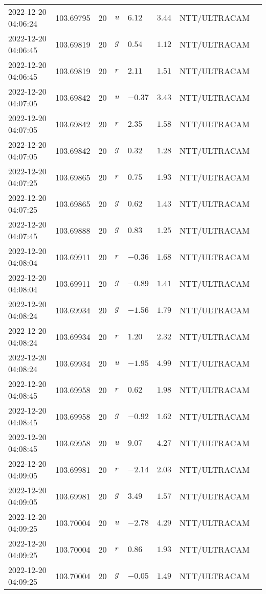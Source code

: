 \documentclass{nature_plusfigure}
\begin{document}
\begin{supplement}
\begin{center}
\begin{longtable}{llllllll}
2022-12-20 04:06:24 & 103.69795 & 20 & $u$ & $6.12$ & $3.44$ & NTT/ULTRACAM &  \\ 
2022-12-20 04:06:45 & 103.69819 & 20 & $g$ & $0.54$ & $1.12$ & NTT/ULTRACAM &  \\ 
2022-12-20 04:06:45 & 103.69819 & 20 & $r$ & $2.11$ & $1.51$ & NTT/ULTRACAM &  \\ 
2022-12-20 04:07:05 & 103.69842 & 20 & $u$ & $-0.37$ & $3.43$ & NTT/ULTRACAM &  \\ 
2022-12-20 04:07:05 & 103.69842 & 20 & $r$ & $2.35$ & $1.58$ & NTT/ULTRACAM &  \\ 
2022-12-20 04:07:05 & 103.69842 & 20 & $g$ & $0.32$ & $1.28$ & NTT/ULTRACAM &  \\ 
2022-12-20 04:07:25 & 103.69865 & 20 & $r$ & $0.75$ & $1.93$ & NTT/ULTRACAM &  \\ 
2022-12-20 04:07:25 & 103.69865 & 20 & $g$ & $0.62$ & $1.43$ & NTT/ULTRACAM &  \\ 
2022-12-20 04:07:45 & 103.69888 & 20 & $g$ & $0.83$ & $1.25$ & NTT/ULTRACAM &  \\ 
2022-12-20 04:08:04 & 103.69911 & 20 & $r$ & $-0.36$ & $1.68$ & NTT/ULTRACAM &  \\ 
2022-12-20 04:08:04 & 103.69911 & 20 & $g$ & $-0.89$ & $1.41$ & NTT/ULTRACAM &  \\ 
2022-12-20 04:08:24 & 103.69934 & 20 & $g$ & $-1.56$ & $1.79$ & NTT/ULTRACAM &  \\ 
2022-12-20 04:08:24 & 103.69934 & 20 & $r$ & $1.20$ & $2.32$ & NTT/ULTRACAM &  \\ 
2022-12-20 04:08:24 & 103.69934 & 20 & $u$ & $-1.95$ & $4.99$ & NTT/ULTRACAM &  \\ 
2022-12-20 04:08:45 & 103.69958 & 20 & $r$ & $0.62$ & $1.98$ & NTT/ULTRACAM &  \\ 
2022-12-20 04:08:45 & 103.69958 & 20 & $g$ & $-0.92$ & $1.62$ & NTT/ULTRACAM &  \\ 
2022-12-20 04:08:45 & 103.69958 & 20 & $u$ & $9.07$ & $4.27$ & NTT/ULTRACAM &  \\ 
2022-12-20 04:09:05 & 103.69981 & 20 & $r$ & $-2.14$ & $2.03$ & NTT/ULTRACAM &  \\ 
2022-12-20 04:09:05 & 103.69981 & 20 & $g$ & $3.49$ & $1.57$ & NTT/ULTRACAM &  \\ 
2022-12-20 04:09:25 & 103.70004 & 20 & $u$ & $-2.78$ & $4.29$ & NTT/ULTRACAM &  \\ 
2022-12-20 04:09:25 & 103.70004 & 20 & $r$ & $0.86$ & $1.93$ & NTT/ULTRACAM &  \\ 
2022-12-20 04:09:25 & 103.70004 & 20 & $g$ & $-0.05$ & $1.49$ & NTT/ULTRACAM &  \\ 

\end{longtable}
\end{center}
\end{supplement}
\end{document}
